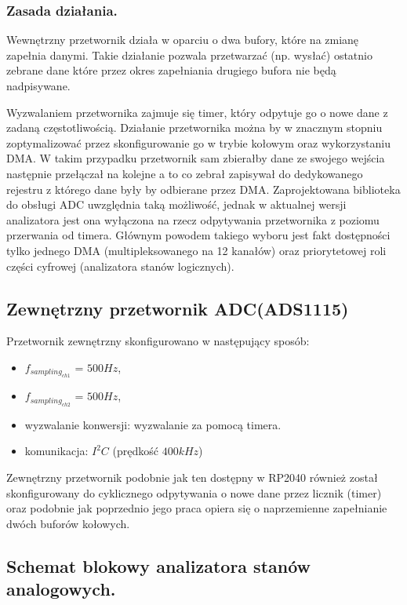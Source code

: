 \subsubsection{Zasada działania.}
    Wewnętrzny przetwornik działa w oparciu o dwa bufory, które na zmianę zapełnia danymi. Takie 
    działanie pozwala przetwarzać (np. wysłać) ostatnio zebrane dane które przez okres 
    zapełniania drugiego bufora nie będą nadpisywane.

    Wyzwalaniem przetwornika zajmuje się timer, który odpytuje go o nowe dane z zadaną częstotliwością.
    Działanie przetwornika można by w znacznym stopniu zoptymalizować przez skonfigurowanie go w trybie kołowym oraz wykorzystaniu DMA. 
    W takim przypadku przetwornik sam zbierałby dane ze swojego wejścia następnie przełączał na kolejne a to co zebrał zapisywał do dedykowanego rejestru z którego dane były by odbierane przez DMA.
    Zaprojektowana biblioteka do obsługi ADC uwzględnia taką możliwość, jednak w aktualnej wersji analizatora jest ona wyłączona na rzecz odpytywania przetwornika z poziomu przerwania od timera. 
    Głównym powodem takiego wyboru jest fakt dostępności tylko jednego DMA (multipleksowanego na 12 kanałów) oraz priorytetowej roli części cyfrowej (analizatora stanów logicznych).


\subsection{Zewnętrzny przetwornik ADC(ADS1115)}
Przetwornik zewnętrzny skonfigurowano w następujący sposób:
\begin{itemize}
    \item $f_{sampling_{ch1}}$ = $500Hz$, 
    \item $f_{sampling_{ch2}}$ = $500Hz$,
    \item wyzwalanie konwersji: wyzwalanie za pomocą timera. 
    \item komunikacja: $I^2C$ (prędkość $400kHz$)
\end{itemize}

Zewnętrzny przetwornik podobnie jak ten dostępny w RP2040 również został skonfigurowany do cyklicznego odpytywania
o nowe dane przez licznik (timer) oraz podobnie jak poprzednio jego praca opiera się o naprzemienne zapełnianie dwóch buforów kołowych. \\

\subsection{Schemat blokowy analizatora stanów analogowych.}

